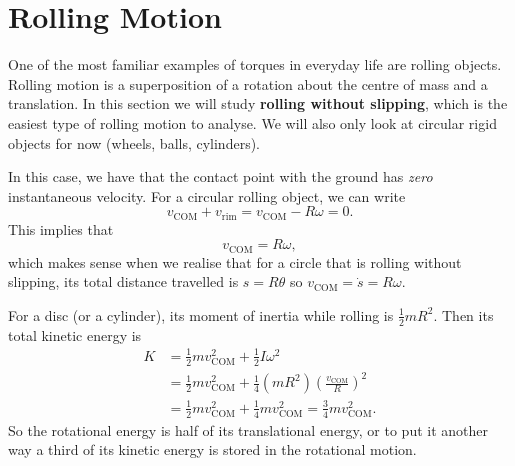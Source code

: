 \documentclass[../classical_mechanics.tex]{subfiles}
\begin{document}
    \section{Rolling Motion}\label{sec:rolling-motion}
        One of the most familiar examples of torques in everyday life are rolling objects.
        Rolling motion is a superposition of a rotation about the centre of mass and a translation.
        In this section we will study \textbf{rolling without slipping}, which is the easiest type of rolling motion to analyse.
        We will also only look at circular rigid objects for now (wheels, balls, cylinders).
        \begin{figure}[H]
            \centering
        \end{figure}
        In this case, we have that the contact point with the ground has \textit{zero} instantaneous velocity.
        For a circular rolling object, we can write
        \begin{equation}
            v_\text{COM}+v_\text{rim}=v_\text{COM}-R\omega=0.
        \end{equation}
        This implies that
        \begin{equation}
            v_\text{COM}=R\omega,
        \end{equation}
        which makes sense when we realise that for a circle that is rolling without slipping, its total distance travelled is $s=R\theta$ so $v_\text{COM}=\dot{s}=R\omega$.

        For a disc (or a cylinder), its moment of inertia while rolling is $\frac{1}{2}mR^2$.
        Then its total kinetic energy is
        \begin{align}
            K&=\frac{1}{2}mv_\text{COM}^2+\frac{1}{2}I\omega^2\\
            &=\frac{1}{2}mv_\text{COM}^2+\frac{1}{4}(mR^2)\left(\frac{v_\text{COM}}{R}\right)^2\\
            &=\frac{1}{2}mv_\text{COM}^2+\frac{1}{4}mv_\text{COM}^2=\frac{3}{4}mv_\text{COM}^2.
        \end{align}
        So the rotational energy is half of its translational energy, or to put it another way a third of its kinetic energy is stored in the rotational motion.
\end{document}
